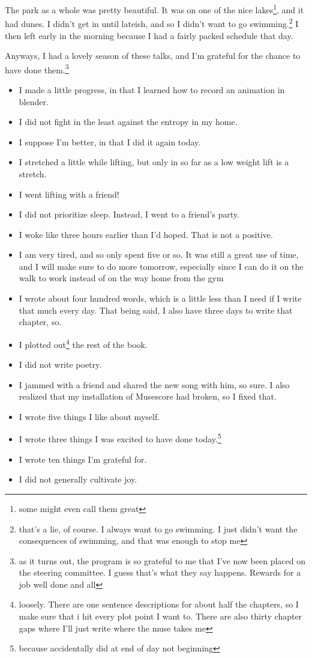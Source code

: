 \documentclass[12pt]{article}[titlepage]
\newcommand{\1}{\={a}}
\newcommand{\2}{\={e}}
\newcommand{\3}{\={\i}}
\newcommand{\4}{\=o}
\newcommand{\5}{\=u}
\newcommand{\6}{\={A}}
\renewcommand{\,}{\textsuperscript{,}}
\begin{document}
The park as a whole was pretty beautiful.
It was on one of the nice lakes\footnote{some might even call them great}, and it had dunes.
I didn't get in until lateish, and so I didn't want to go swimming.\footnote{that's a lie, of course. I always want to go swimming.
I just didn't want the consequences of swimming, and that was enough to stop me}
I then left early in the morning because I had a fairly packed schedule that day.

Anyways, I had a lovely season of these talks, and I'm grateful for the chance to have done them.\footnote{as it turns out, the program is so grateful to me that I've now been placed on the steering committee.
I guess that's what they say happens.
Rewards for a job well done and all}

\begin{itemize}
\item I made a little progress, in that I learned how to record an animation in blender.
\item I did not fight in the least against the entropy in my home.
\item I suppose I'm better, in that I did it again today.
\item I stretched a little while lifting, but only in so far as a low weight lift is a stretch.
\item I went lifting with a friend!
\item I did not prioritize sleep. Instead, I went to a friend's party.
\item I woke like three hours earlier than I'd hoped. That is not a positive.
\item I am very tired, and so only spent five or so.
It was still a great use of time, and I will make sure to do more tomorrow, especially since I can do it on the walk to work instead of on the way home from the gym
\item I wrote about four hundred words, which is a little less than I need if I write that much every day.
That being said, I also have three days to write that chapter, so.
\item I plotted out\footnote{loosely. There are one sentence descriptions for about half the chapters, so I make sure that i hit every plot point I want to.
There are also thirty chapter gaps where I'll just write where the muse takes me} the rest of the book.
\item I did not write poetry.
\item I jammed with a friend and shared the new song with him, so sure.
I also realized that my installation of Musescore had broken, so I fixed that.
\item I wrote five things I like about myself.
\item I wrote three things I was excited to have done today.\footnote{because accidentally did at end of day not beginning}
\item I wrote ten things I'm grateful for.
\item I did not generally cultivate joy.
\end{itemize}
\end{document}
